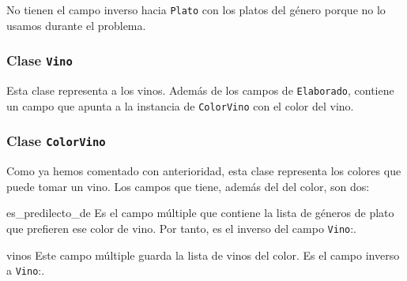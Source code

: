 No tienen el campo inverso hacia \verb+Plato+ con los platos del género porque
no lo usamos durante el problema.

\subsubsection{Clase \texttt{Vino}}
Esta clase representa a los vinos. Además de los campos de \verb+Elaborado+,
contiene un campo  que apunta a la instancia de \verb+ColorVino+
con el color del vino.

\subsubsection{Clase \texttt{ColorVino}}
Como ya hemos comentado con anterioridad, esta clase representa los colores que
puede tomar un vino. Los campos que tiene, además del  del color, son dos:
\begin{slotlist}
\item[es\_predilecto\_de] Es el campo múltiple que contiene la lista de géneros
  de plato que prefieren ese color de vino. Por tanto, es el inverso del campo
  \verb+Vino+:.
\item[vinos] Este campo múltiple guarda la lista de vinos del color. Es el campo inverso a \verb+Vino+:.
\end{slotlist}
